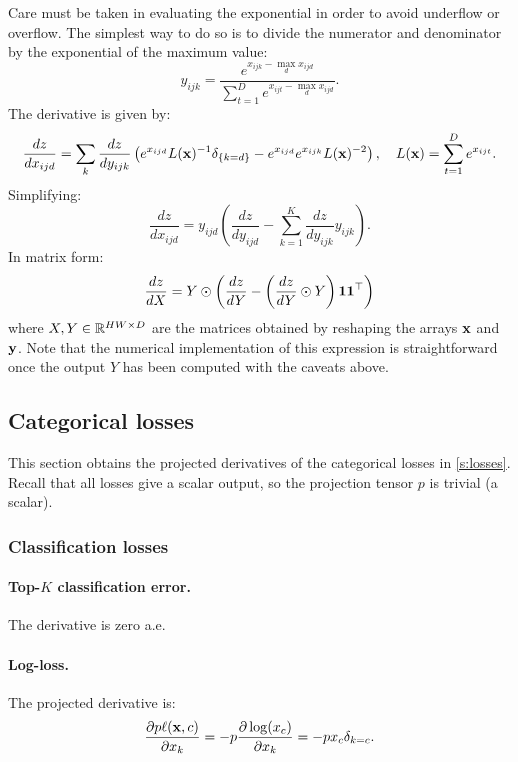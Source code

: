 Care must be taken in evaluating the exponential in order to avoid underflow or overflow. The simplest way to do so is to divide the numerator and denominator by the exponential of the maximum value:
\[
y_{ijk} = \frac{e^{x_{ijk} - \max_d x_{ijd}}}{\sum_{t=1}^D e^{x_{ijt}- \max_d x_{ijd}}}.
\]
The derivative is given by:
\[
\frac{dz}{d x_{ijd}}
=
\sum_{k}
\frac{dz}{d y_{ijk}}
\left(
e^{x_{ijd}} L(\mathbf{x})^{-1} \delta_{\{k=d\}}
-
e^{x_{ijd}}
e^{x_{ijk}} L(\mathbf{x})^{-2}
\right),
\quad
L(\mathbf{x}) = \sum_{t=1}^D e^{x_{ijt}}.
\]
Simplifying:
\[
\frac{dz}{d x_{ijd}}
=
y_{ijd} 
\left(
\frac{dz}{d y_{ijd}}
-
\sum_{k=1}^K
\frac{dz}{d y_{ijk}} y_{ijk}
\right).
\]
In matrix form:
\[
\frac{dz}{dX} = Y \odot \left(\frac{dz}{dY} 
- \left(\frac{dz}{dY} \odot Y\right) \mathbf{1}\mathbf{1}^\top\right)
\]
where $X,Y\in\mathbb{R}^{HW\times D}$ are the matrices obtained by reshaping the arrays
$\mathbf{x}$ and $\mathbf{y}$. Note that the numerical implementation of this expression is straightforward once the output $Y$ has been computed with the caveats above.

\subsection{Categorical losses}\label{s:impl-losses}

This section obtains the projected derivatives of the categorical losses in \cref{s:losses}. Recall that all losses give a scalar output, so the projection tensor $p$ is trivial (a scalar).

\subsubsection{Classification losses}\label{s:impl-loss-classification}

\paragraph{Top-$K$ classification error.} The derivative is zero a.e.\

\paragraph{Log-loss.} The projected derivative is:
\[
\frac{\partial p \ell(\mathbf{x},c)}{\partial x_k}
=
- p \frac{\partial \log (x_c) }{\partial x_k}
=
- p x_c \delta_{k=c}.
\]

